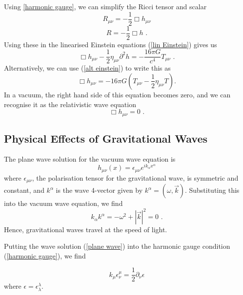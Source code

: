 \documentclass[11pt]{cuthesis}
\newcommand{\mn}{_{\mu\nu}}
\newcommand{\fs}{\text{ .}}
\begin{document}
Using \ref{harmonic gauge}, we can simplify the Ricci tensor and scalar
\begin{equation}
R\mn = -\frac{1}{2}\Box h\mn
\end{equation}
\begin{equation}
R=-\frac{1}{2}\Box h \fs
\end{equation}
Using these in the linearised Einstein equations (\ref{lin Einstein}) gives us
\begin{equation} \label{lin einstein eqn}
\Box h\mn - \frac{1}{2}\eta\mn\partial^2 h =-\frac{16\pi G}{c^4}T\mn \fs
\end{equation}
Alternatively, we can use (\ref{alt einstein}) to write this as
\begin{equation}
\Box h\mn = -16\pi G \left( T\mn -\frac{1}{2} \eta\mn T \right). 
\end{equation}
In a vacuum, the right hand side of this equation becomes zero, and we can recognise it as the relativistic wave equation
 \begin{equation}
\Box h\mn = 0 \fs
\end{equation}

\subsection{Physical Effects of Gravitational Waves} \label{sec:GW effects}
The plane wave solution for the vacuum wave equation is
\begin{equation} \label{plane wave}
h\mn (x) = \epsilon\mn e^{ik_\alpha x^\alpha} 
\end{equation}
where $\epsilon\mn$, the polarisation tensor for the gravitational wave, is symmetric and constant, and $k^\alpha$ is the wave 4-vector given by $k^\alpha = (\omega,\vec{k})$. Substituting this into the vacuum wave equation, we find 
\begin{equation}
k_\alpha k^\alpha = -\omega^2 + |\vec{k}|^2 =0 \fs
\end{equation}
Hence, gravitational waves travel at the speed of light. 

Putting the wave solution (\ref{plane wave}) into the harmonic gauge condition (\ref{harmonic gauge}), we find

\begin{equation}  \label{harmonic gauge2}
k_\mu \epsilon^\mu_\nu = \frac{1}{2}\partial_\nu \epsilon
\end{equation}
where $\epsilon=\epsilon^\lambda_\lambda$.
\end{document}
